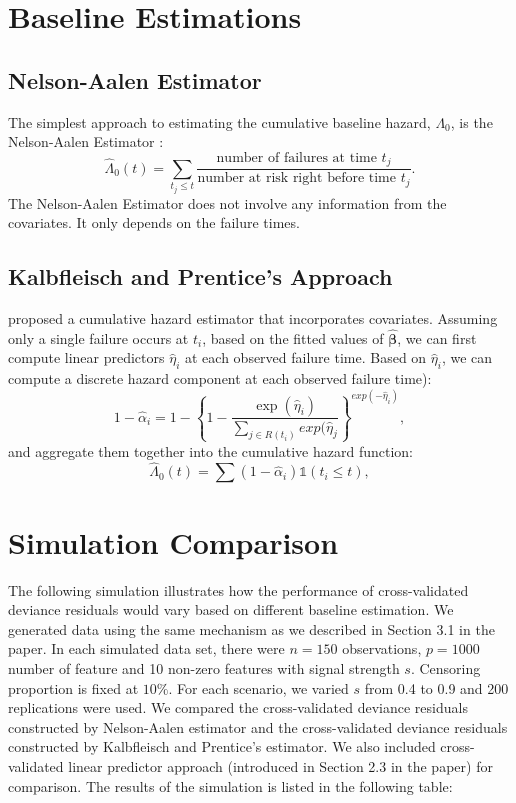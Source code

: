 \documentclass{article}
\newcommand{\bbeta}{\boldsymbol{\beta}}
\begin{document}
\section{Baseline Estimations}

	\subsection{Nelson-Aalen Estimator}
	 The simplest approach to estimating the cumulative baseline hazard, $\Lambda_0$, is the Nelson-Aalen Estimator \citep{nelson1969, aalen1978}:
\begin{equation}
  \hat{\Lambda}_{0}(t) = \sum_{t_j \leq t}\frac{\text{number of failures at time } t_j}{\text{number at risk right before time }t_j}.
\end{equation}
	The Nelson-Aalen Estimator does not involve any information from the covariates. It only depends on the failure times.

	\subsection{Kalbfleisch and Prentice's Approach}					
	\cite{Kalbfleisch2011} proposed a cumulative hazard estimator that incorporates covariates. Assuming only a single failure occurs at $t_i$, based on the fitted values of $\hat{\bbeta}$, we can first compute linear predictors $\hat{\eta}_i$ at each observed failure time. Based on $\hat{\eta}_i$, we can compute a discrete hazard component at each observed failure time):
\begin{equation}
1 - \hat{\alpha}_{i} = 1 - \left\{ 1 - \frac{\exp (\hat{\eta}_{i})}{\sum_{ j \in R(t_{i})}exp (\hat{\eta}_{j}} \right\}^{exp(-\hat{\eta}_{i})},
\end{equation}
and aggregate them together into the cumulative hazard function:
\begin{equation} 
\hat{\Lambda}_0(t) = \sum(1 - \hat{\alpha}_i)\mathds{1}(t_{i} \leq t),
\end{equation}

\section{Simulation Comparison}
The following simulation illustrates how the performance of cross-validated deviance residuals would vary based on different baseline estimation. We generated data using the same mechanism as we described in Section 3.1 in the paper. In each simulated data set, there were $n = 150$ observations, $p = 1000$ number of feature and 10 non-zero features with signal strength $s$. Censoring proportion is fixed at $10\%$. For each scenario, we varied $s$ from 0.4 to 0.9 and 200 replications were used. We compared the cross-validated deviance residuals constructed by Nelson-Aalen estimator and the cross-validated deviance residuals constructed by Kalbfleisch and Prentice's estimator. We also included cross-validated linear predictor approach (introduced in Section 2.3 in the paper) for comparison. The results of the simulation is listed in the following table:
\end{document}
